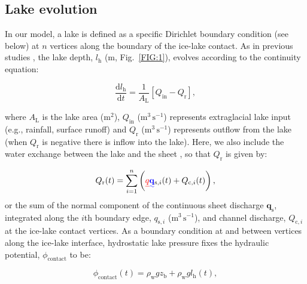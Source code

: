 \documentclass[tc, manuscript]{copernicus}
\providecommand{\DIFadd}[1]{{\protect\color{blue}\uwave{#1}}} %
\providecommand{\DIFdel}[1]{{\protect\color{red}\sout{#1}}} %
\providecommand{\DIFaddbegin}{} %
\providecommand{\DIFaddend}{} %
\providecommand{\DIFdelbegin}{} %
\providecommand{\DIFdelend}{} %
\begin{document}
\subsection{Lake evolution}\label{methods:Lake}

In our model, a lake is defined as a specific Dirichlet boundary condition (see below)  at $n$ vertices along the boundary of the ice-lake contact. As in previous studies \citep[e.g.,][]{kingslake2013modelling}, the lake depth, $l_{\mathrm{h}}$ ($\mathrm{m}$, Fig.~\ref{FIG:1}), evolves according to the continuity equation:

\begin{equation}
\label{eq:lakecontinuity}
\frac{\mathrm{d} l_{\mathrm{h}}}{\mathrm{d} t} = \frac{1}{A_{\mathrm{L}}}[Q_{\mathrm{in}}-Q_{\mathrm{r}}],
\end{equation}

\noindent
where $A_\mathrm{L}$ is the lake area ($\mathrm{m}^2$), $Q_{\mathrm{in}}$ ($\mathrm{m}^3\, \mathrm{s}^{-1}$) represents extraglacial lake input (e.g., rainfall, surface runoff) and $Q_{\mathrm{r}}$ ($\mathrm{m}^3\, \mathrm{s}^{-1}$) represents outflow from the lake (when $Q_{\mathrm{r}}$ is negative there is inflow into the lake). Here, we also include the water exchange between the lake and the sheet \citep[unlike][who isolated cavities from the lake]{kingslake2013modelling}, so that $Q_{\mathrm{r}}$ is given by:

\begin{equation}
\label{eq:sumQr}
Q_{\mathrm{r}}(t) = \sum_{i=1}^{n} \left( \DIFdelbegin \DIFdel{q}\DIFdelend \DIFaddbegin \DIFadd{\mathbf{q}}\DIFaddend _{\mathrm{s},i}(t) + Q_{\mathrm{c},i}(t) \right),
\end{equation}
\noindent
or the sum of the normal component of the continuous sheet discharge $\mathbf{q}_{\mathrm{s}}$, integrated along the $i$th boundary edge, $q_{\mathrm{s},i}$  ($\mathrm{m}^{3}\, \mathrm{s}^{-1}$), and channel discharge, $Q_{\mathrm{c},i}$ at the ice-lake contact vertices. As a boundary condition at and between vertices along the ice-lake interface, hydrostatic lake pressure fixes the hydraulic potential, $\phi_{\mathrm{contact}}$ to be: 

\begin{equation}
\label{eq:lakephi}
\phi_{\mathrm{contact}}(t) = \rho_{\mathrm{w}}gz_{\mathrm{b}} + \rho_{\mathrm{w}}gl_{\mathrm{h}}(t) ,
\end{equation}
\end{document}
